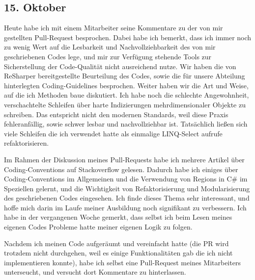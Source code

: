 \subsection{15. Oktober}
Heute habe ich mit einem Mitarbeiter seine Kommentare zu der von mir gestellten Pull-Request besprochen. Dabei habe ich bemerkt, dass ich immer noch zu wenig Wert auf die Lesbarkeit und Nachvollziehbarkeit des von mir geschriebenen Codes lege, und mir zur Verfügung stehende Tools zur Sicherstellung der Code-Qualität nicht ausreichend nutze. Wir haben die von ReSharper bereitgestellte Beurteilung des Codes, sowie die für unsere Abteilung hinterlegten Coding-Guidelines besprochen. Weiter haben wir die Art und Weise, auf die ich Methoden baue diskutiert. Ich habe noch die schlechte Angewohnheit, verschachtelte Schleifen über harte Indizierungen mehrdimensionaler Objekte zu schreiben. Das entspricht nicht den modernen Standards, weil diese Praxis fehleranfällig, sowie schwer lesbar und nachvollziehbar ist. Tatsächlich ließen sich viele Schleifen die ich verwendet hatte als einmalige LINQ-Select aufrufe refaktorisieren. 

Im Rahmen der Diskussion meines Pull-Requests habe ich mehrere Artikel über Coding-Conventions auf Stackoverflow gelesen. Dadurch habe ich einiges über Coding-Conventions im Allgemeinen und die Verwendung von Regions in C\# im Speziellen gelernt, und die Wichtigkeit von Refaktorisierung und Modularisierung des geschriebenen Codes eingesehen. Ich finde dieses Thema sehr interessant, und hoffe mich darin im Laufe meiner Ausbildung noch signifikant zu verbessern. Ich habe in der vergangenen Woche gemerkt, dass selbst ich beim Lesen meines eigenen Codes Probleme hatte meiner eigenen Logik zu folgen.

Nachdem ich meinen Code aufgeräumt und vereinfacht hatte (die PR wird trotzdem nicht durchgehen, weil es einige Funktionalitäten gab die ich nicht implementieren konnte), habe ich selbst eine Pull-Request meines Mitarbeiters unterseucht, und versucht dort Kommentare zu hinterlassen.